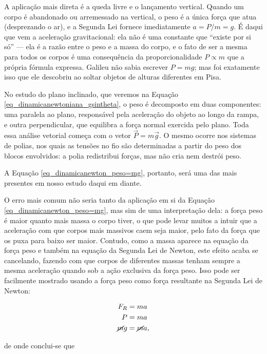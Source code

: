 A aplicação mais direta é a queda livre e o lançamento vertical. Quando
um corpo é abandonado ou arremessado na vertical, o peso é a única força
que atua (desprezando o ar), e a Segunda Lei fornece imediatamente
$a = P/m = g$. É daqui que vem a aceleração gravitacional: ela não é
uma constante que ``existe por si só'' --- ela é a razão entre o peso
e a massa do corpo, e o fato de ser a mesma para todos os corpos é uma
consequência da proporcionalidade $P \propto m$ que a própria fórmula
expressa. Galileu não sabia escrever $P = mg$; mas foi exatamente isso
que ele descobriu ao soltar objetos de alturas diferentes em Pisa.

No estudo do plano inclinado, que veremos na Equação \eqref{eq_dinamicanewtoniana_gsintheta}, o peso é
decomposto em duas componentes: uma paralela ao plano, responsável pela
aceleração do objeto ao longo da rampa, e outra perpendicular, que
equilibra a força normal exercida pelo plano. Toda essa análise vetorial começa com o vetor
$\vec{P} = m\vec{g}$. O mesmo ocorre nos sistemas de polias, nos quais as tensões no fio são
determinadas a partir do peso dos blocos envolvidos: a polia redistribui
forças, mas não cria nem destrói peso. 

A Equação \eqref{eq_dinamicanewton_peso=mg}, portanto, será uma das mais presentes em nosso estudo daqui em diante.



O erro mais comum não seria tanto da aplicação em si da Equação \eqref{eq_dinamicanewton_peso=mg}, mas sim de uma interpretação dela: a força peso é maior quanto mais massa o corpo tiver, o que pode levar muitos a intuir que a aceleração com que corpos mais massivos caem seja maior, pelo fato da força que os puxa para baixo ser maior. Contudo, como a massa aparece na equação da força peso e também na equação da Segunda Lei de Newton, este efeito acaba se cancelando, fazendo com que corpos de diferentes massas tenham sempre a mesma aceleração quando sob a ação exclusiva da força peso. Isso pode ser facilmente mostrado usando a força peso como força resultante na Segunda Lei de Newton:

\begin{align}
    F_R &= ma \nonumber \\
    P &= ma  \nonumber \\
    \cancel mg &= \cancel ma, \nonumber 
\end{align}

\noindent de onde conclui-se que 

